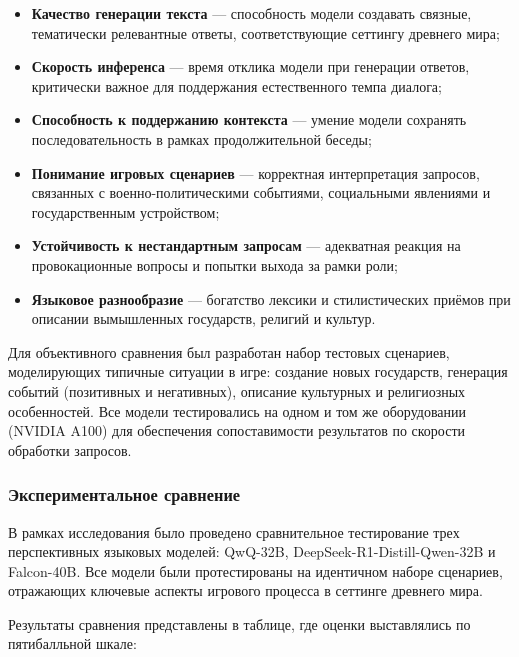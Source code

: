 \begin{itemize}
\item \textbf{Качество генерации текста} — способность модели создавать связные, тематически релевантные ответы, соответствующие сеттингу древнего мира;
\item \textbf{Скорость инференса} — время отклика модели при генерации ответов, критически важное для поддержания естественного темпа диалога;
\item \textbf{Способность к поддержанию контекста} — умение модели сохранять последовательность в рамках продолжительной беседы;
\item \textbf{Понимание игровых сценариев} — корректная интерпретация запросов, связанных с военно-политическими событиями, социальными явлениями и государственным устройством;
\item \textbf{Устойчивость к нестандартным запросам} — адекватная реакция на провокационные вопросы и попытки выхода за рамки роли;
\item \textbf{Языковое разнообразие} — богатство лексики и стилистических приёмов при описании вымышленных государств, религий и культур.
\end{itemize}

Для объективного сравнения был разработан набор тестовых сценариев, моделирующих типичные ситуации в игре: создание новых государств, генерация событий (позитивных и негативных), описание культурных и религиозных особенностей. Все модели тестировались на одном и том же оборудовании (NVIDIA A100) для обеспечения сопоставимости результатов по скорости обработки запросов.
\subsubsection{Экспериментальное сравнение}

В рамках исследования было проведено сравнительное тестирование трех перспективных языковых моделей: QwQ-32B, DeepSeek-R1-Distill-Qwen-32B и Falcon-40B. Все модели были протестированы на идентичном наборе сценариев, отражающих ключевые аспекты игрового процесса в сеттинге древнего мира.

Результаты сравнения представлены в таблице, где оценки выставлялись по пятибалльной шкале:


